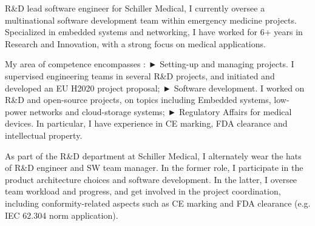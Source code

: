 \documentclass[12pt,a4paper,sans]{moderncv}
\begin{document}
R&D lead software engineer for Schiller Medical, I currently oversee a multinational software development team within emergency medicine projects. Specialized in embedded systems and networking, I have worked for 6+ years in Research and Innovation, with a strong focus on medical applications.

My area of competence encompasses :
► Setting-up and managing projects. I supervised engineering teams in several R&D projects, and initiated and developed an EU H2020 project proposal; 
► Software development. I worked on R&D and open-source projects, on topics including Embedded systems, low-power networks and cloud-storage systems;
► Regulatory Affairs for medical devices. In particular, I have experience in CE marking, FDA clearance and intellectual property.



As part of the R&D department at Schiller Medical, I alternately wear the hats of R&D engineer and SW team manager. In the former role, I participate in the product architecture choices and software development. In the latter, I oversee team workload and progress, and get involved in the project coordination, including conformity-related aspects such as CE marking and FDA clearance (e.g. IEC 62.304 norm application).


\makeletterclosing
\end{document}
